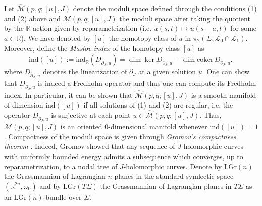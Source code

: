 \documentclass[11pt,colorinlistoftodos]{amsart}
\numberwithin{equation}{subsection}
\theoremstyle{plain}
\theoremstyle{definition}
\theoremstyle{remark}
\newcommand{\R}{\mathbb{R}}
\newcommand{\de}{\partial}
\newcommand{\calL}{\mathcal{L}}
\newcommand{\calM}{\mathcal{M}}
\begin{document}
Let $\widehat{\calM}(p,q;[u],J)$ denote the moduli space defined through the conditions (1) and (2) above and $\calM(p,q;[u],J)$ the moduli space after taking the quotient by the $\R$-action given by reparametrization (i.e. $u(s,t)\mapsto u(s-a,t)$ for some $a\in\R$). We have denoted by $[u]$ the homotopy class of $u$ in $\pi_2(\Sigma,\calL_0\cap\calL_1)$. Moreover, define the \emph{Maslov index} of the homotopy class $[u]$ as 
\[
\mathrm{ind}([u]):=\mathrm{ind}_\R(D_{\bar\de_J,u})=\dim\ker D_{\bar\de_J,u}-\dim \mathrm{coker}\, D_{\bar\de_J,u}, 
\]
where $D_{\bar\de_J,u}$ denotes the linearization of $\bar\de_J$ at a given solution $u$. One can show that $D_{\bar \de_J,u}$ is indeed a Fredholm operator and thus one can compute its Fredholm index. In particular, it can be shown that $\widehat{\calM}(p,q;[u],J)$ is a smooth manifold of dimension $\mathrm{ind}([u])$ if all solutions of (1) and (2) are regular, i.e. the operator $D_{\bar\de_J,u}$ is surjective at each point $u\in\widehat{\calM}(p,q;[u],J)$. Thus, $\calM(p,q;[u],J)$ is an oriented 0-dimensional manifold whenever $\mathrm{ind}([u])=1$. 
Compactness of the moduli space is given through \emph{Gromov's compactness theorem} \cite{Gromov1985}. Indeed, Gromov showed that any sequence of $J$-holomorphic curves with uniformly bounded energy admits a subsequence which converges, up to reparametrization, to a nodal tree of $J$-holomorphic curves. 
Denote by $\mathrm{LGr}(n)$ the Grassmannian of Lagrangian $n$-planes in the standard symlectic space $(\R^{2n},\omega_0)$ and by $\mathrm{LGr}(T\Sigma)$ the Grassmannian of Lagrangian planes in $T\Sigma$ as an $\mathrm{LGr}(n)$-bundle over $\Sigma$.
\end{document}
